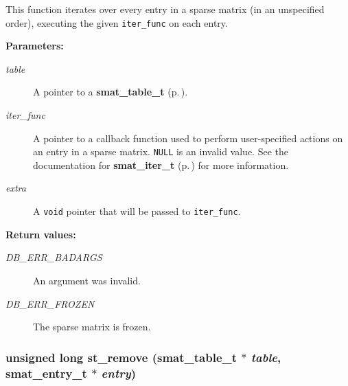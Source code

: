  This function iterates over every entry in a sparse matrix (in an unspecified order), executing the given {\tt iter\_\-func} on each entry.\begin{Desc}
\item[{\bf Parameters: }]\par
\begin{description}
\item[
{\em table}]A pointer to a {\bf smat\_\-table\_\-t} {\rm (p.\,\pageref{group__dbprim__smat_a0})}. \item[
{\em iter\_\-func}]A pointer to a callback function used to perform user-specified actions on an entry in a sparse matrix. {\tt NULL} is an invalid value. See the documentation for {\bf smat\_\-iter\_\-t} {\rm (p.\,\pageref{group__dbprim__smat_a4})} for more information. \item[
{\em extra}]A {\tt void} pointer that will be passed to {\tt iter\_\-func}.\end{description}
\end{Desc}
\begin{Desc}
\item[{\bf Return values: }]\par
\begin{description}
\item[
{\em DB\_\-ERR\_\-BADARGS}]An argument was invalid. \item[
{\em DB\_\-ERR\_\-FROZEN}]The sparse matrix is frozen. \end{description}
\end{Desc}
\subsubsection{\setlength{\rightskip}{0pt plus 5cm}unsigned long st\_\-remove ({\bf smat\_\-table\_\-t} $\ast$ {\em table}, {\bf smat\_\-entry\_\-t} $\ast$ {\em entry})}\label{group__dbprim__smat_a11}




